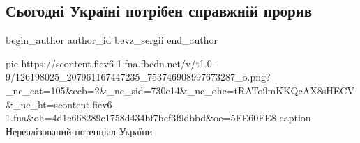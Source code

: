  
 
 
 
 
 
\subsection{Сьогодні Україні потрібен справжній прорив}
\label{sec:19_11_2020.fb.bevz_sergii.1.ukraini_potriben_proryv}
\ifcmt
	begin_author
   author_id bevz_sergii
	end_author
\fi

\ifcmt
pic https://scontent.fiev6-1.fna.fbcdn.net/v/t1.0-9/126198025_207961167447235_753746908997673287_o.png?_nc_cat=105&ccb=2&_nc_sid=730e14&_nc_ohc=tRATo9mKKQcAX8sHECV&_nc_ht=scontent.fiev6-1.fna&oh=4d1e668289e1758d434bf7bcf3f9dbbd&oe=5FE60FE8
caption Нереалізований потенціал України
\fi

